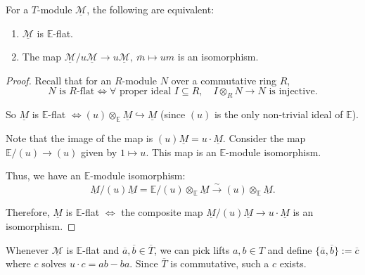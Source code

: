 \begin{lemma}\label{E-flatness}
	For a $T$-module $\underline{\mathcal M}$, the following are equivalent:
	\begin{enumerate}
		\item $\underline{\mathcal M}$ is $\mathbb E$-flat.
		\item The map $\underline{\mathcal M}/u\underline{\mathcal M} \to u\underline{\mathcal M},\ \bar{m} \mapsto um$ is an isomorphism.
	\end{enumerate}
\end{lemma}
\begin{proof}
	Recall that for an $R$-module $N$ over a commutative ring $R$,
	\[
		N \text{ is } R\text{-flat} \iff \forall \text{ proper ideal } I \subseteq R, \quad I \otimes_R N \to N \text{ is injective.}
	\]

	So $\underline{M}$ is $\mathbb{E}$-flat $\iff (u) \otimes_{\mathbb{E}} \underline{M} \hookrightarrow \underline{M}$
	(since $(u)$ is the only non-trivial ideal of $\mathbb{E}$).

	Note that the image of the map is $(u)\underline{M} = u \cdot \underline{M}$.
	Consider the map $\mathbb{E}/(u) \to (u)$ given by $1 \mapsto u$. This map is an $\mathbb{E}$-module isomorphism.

	Thus, we have an $\mathbb{E}$-module isomorphism:
	\[
		\underline{M}/(u)\underline{M} = \mathbb{E}/(u) \otimes_{\mathbb{E}} \underline{M} \xrightarrow{\sim} (u) \otimes_{\mathbb{E}} \underline{M}.
	\]

	Therefore, $\underline{M}$ is $\mathbb{E}$-flat $\iff$ the composite map $\underline{M}/(u)\underline{M} \longrightarrow u \cdot \underline{M} $
	is an isomorphism.
\end{proof}

Whenever $\underline{\mathcal M}$ is $\mathbb E$-flat and $\overline a,\overline b\in\overline T$, we can pick
lifts $a,b\in T$ and define $\{\overline a,\overline b\} := \overline c$ where $c$ solves $u\cdot c = ab-ba$. Since $\overline{T}$ is commutative, such a $c$ exists.

